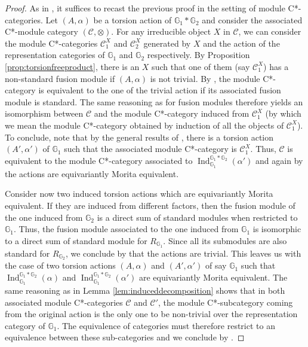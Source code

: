 \documentclass[a4paper, 11pt]{amsart}
\theoremstyle{plain}
\theoremstyle{definition}
\theoremstyle{remark}
\DeclareMathOperator{\Ind}{Ind}
\newcommand{\G}{\mathbb{G}}
\begin{document}
\begin{proof}
As in \cite[Thm 3.16]{arano2015torsion}, it suffices to recast the previous proof in the setting of module C*-categories. Let $(A, \alpha)$ be a torsion action of $\G_{1}\ast\G_{2}$ and consider the associated C*-module category $(\mathcal{C}, \otimes)$. For any irreducible object $X$ in $\mathcal{C}$, we can consider the module C*-categories $\mathcal{C}_{1}^{X}$ and $\mathcal{C}_{2}^{X}$ generated by $X$ and the action of the representation categories of $\G_{1}$ and $\G_{2}$ respectively. By Proposition \ref{prop:torsionfreeproduct}, there is an $X$ such that one of them (say $\mathcal{C}_{1}^{X}$) has a non-standard fusion module if $(A, \alpha)$ is not trivial. By \cite[Lem 3.10]{arano2015torsion}, the module C*-category is equivalent to the one of the trivial action if its associated fusion module is standard. The same reasoning as for fusion modules therefore yields an isomorphism between $\mathcal{C}$ and the module C*-category induced from $\mathcal{C}_{1}^{X}$ (by which we mean the module C*-category obtained by induction of all the objects of $\mathcal{C}_{1}^{X}$). To conclude, note that by the general results of \cite{de2013tannaka}, there is a torsion action $(A', \alpha')$ of $\G_{1}$ such that the associated module C*-category is $\mathcal{C}_{1}^{X}$. Thus, $\mathcal{C}$ is equivalent to the module C*-category associated to $\Ind_{\G_{1}}^{\G_{1}\ast\G_{2}}(\alpha')$ and again by \cite{de2013tannaka} the actions are equivariantly Morita equivalent.

Consider now two induced torsion actions which are equivariantly Morita equivalent. If they are induced from different factors, then the fusion module of the one induced from $\G_{2}$ is a direct sum of standard modules when restricted to $\G_{1}$. Thus, the fusion module associated to the one induced from $\G_{1}$ is isomorphic to a direct sum of standard module for $R_{\G_{1}}$. Since all its submodules are also standard for $R_{\G_{2}}$, we conclude by \cite[Thm 1.25]{arano2015torsion} that the actions are trivial. This leaves us with the case of two torsion actions $(A, \alpha)$ and $(A', \alpha')$ of say $\G_{1}$ such that $\Ind_{\G_{1}}^{\G_{1}\ast\G_{2}}(\alpha)$ and $\Ind_{\G_{1}}^{\G_{1}\ast\G_{2}}(\alpha')$ are equivariantly Morita equivalent. The same reasoning as in Lemma \ref{lem:induceddecomposition} shows that in both associated module C*-categories $\mathcal{C}$ and $\mathcal{C}'$, the module C*-subcategory coming from the original action is the only one to be non-trivial over the representation category of $\G_{1}$. The equivalence of categories must therefore restrict to an equivalence between these sub-categories and we conclude by \cite{de2013tannaka}.
\end{proof}
\end{document}
